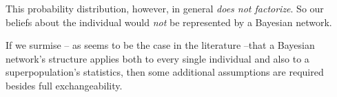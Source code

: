 \documentclass[\ifafour a4paper,12pt,\else a5paper,10pt,\fi%
onecolumn,oneside,article,%
british%
]{memoir}
\theoremstyle{remark}
\theoremstyle{innote}
\renewcommand*{\|}[1][]{\nonscript\,#1\vert\nonscript\,\mathopen{}}
\newcommand*{\sect}{\S}%
\renewcommand*{\=}{\TextOrMath\texteq\eq}
\begin{document}
This probability distribution, however, in general \emph{does not
  factorize}. So our beliefs about the individual would \emph{not} be
represented by a Bayesian network.

If we surmise -- as seems to be the case in the literature --that a Bayesian
network's structure applies both to every single individual and also to a
superpopulation's statistics, then some additional assumptions are required
besides full exchangeability.







\end{document}
